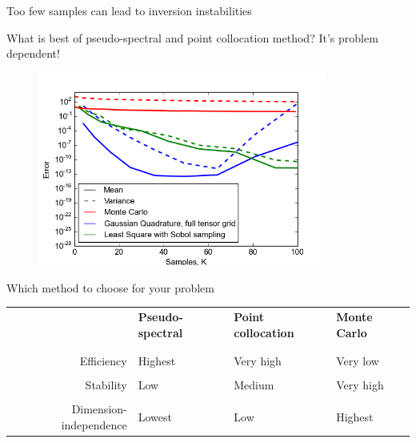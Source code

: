 \documentclass{beamer}
\begin{document}
\begin{frame}{Too few samples can lead to inversion instabilities}
\end{frame}


\begin{frame}{What is best of pseudo-spectral and point collocation method? It's problem dependent!}{}
      \begin{figure}
  \includegraphics[width=0.85\textwidth]{MC_convergence_2D_diff.png}
 \end{figure}
\end{frame}

\begin{frame}{Which method to choose for your problem}{}
    \scriptsize
    \begin{tabular}{r|lll}
        & \bf Pseudo-spectral &
        \bf Point collocation & \bf Monte Carlo \\ \\ \hline \pause\\
        Efficiency              & \color{green} Highest
            & \color{green} Very high & \color{red} Very low  \pause\\\\
        Stability               & \color{red} Low
            & Medium   & \color{green}Very high \pause\\\\
            Dimension-independence  & \color{red} Lowest
            & \color{red} Low    & \color{green} Highest
    \end{tabular}
\end{frame}
\end{document}
